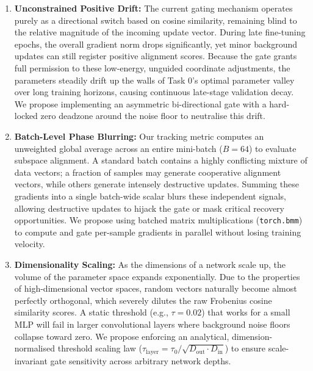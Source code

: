\documentclass[10pt,a4paper]{article}
\begin{document}
		\begin{enumerate}
			\item \textbf{Unconstrained Positive Drift:} 
			The current gating mechanism operates purely as a directional switch based on cosine similarity, remaining blind to the relative magnitude of the incoming update vector. During late fine-tuning epochs, the overall gradient norm drops significantly, yet minor background updates can still register positive alignment scores. Because the gate grants full permission to these low-energy, unguided coordinate adjustments, the parameters steadily drift up the walls of Task 0's optimal parameter valley over long training horizons, causing continuous late-stage validation decay. We propose implementing an asymmetric bi-directional gate with a hard-locked zero deadzone around the noise floor to neutralise this drift.
			
			\item \textbf{Batch-Level Phase Blurring:} 
			Our tracking metric computes an unweighted global average across an entire mini-batch ($B=64$) to evaluate subspace alignment. A standard batch contains a highly conflicting mixture of data vectors; a fraction of samples may generate cooperative alignment vectors, while others generate intensely destructive updates. Summing these gradients into a single batch-wide scalar blurs these independent signals, allowing destructive updates to hijack the gate or mask critical recovery opportunities. We propose using batched matrix multiplications (\texttt{torch.bmm}) to compute and gate per-sample gradients in parallel without losing training velocity.
			
			\item \textbf{Dimensionality Scaling:} 
			As the dimensions of a network scale up, the volume of the parameter space expands exponentially. Due to the properties of high-dimensional vector spaces, random vectors naturally become almost perfectly orthogonal, which severely dilutes the raw Frobenius cosine similarity scores. A static threshold (e.g., $\tau = 0.02$) that works for a small MLP will fail in larger convolutional layers where background noise floors collapse toward zero. We propose enforcing an analytical, dimension-normalised threshold scaling law ($\tau_{\text{layer}} = \tau_0 / \sqrt{D_{\text{out}} \cdot D_{\text{in}}}$) to ensure scale-invariant gate sensitivity across arbitrary network depths.
		\end{enumerate}
\end{document}
